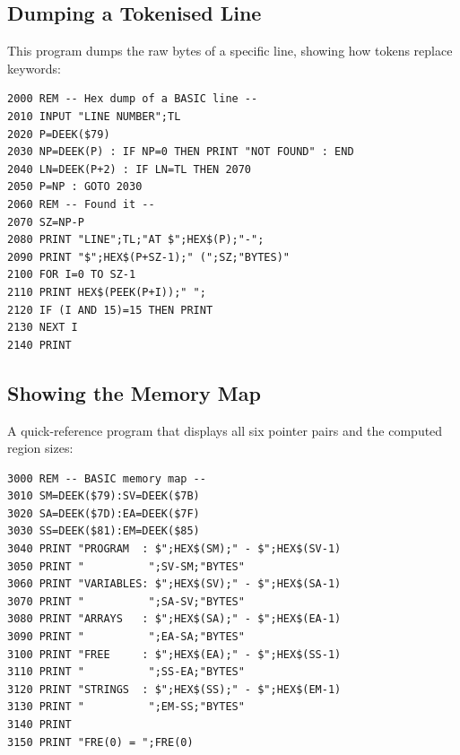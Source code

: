 \subsection{Dumping a Tokenised Line}

This program dumps the raw bytes of a specific line, showing how tokens
replace keywords:

\begin{lstlisting}
2000 REM -- Hex dump of a BASIC line --
2010 INPUT "LINE NUMBER";TL
2020 P=DEEK($79)
2030 NP=DEEK(P) : IF NP=0 THEN PRINT "NOT FOUND" : END
2040 LN=DEEK(P+2) : IF LN=TL THEN 2070
2050 P=NP : GOTO 2030
2060 REM -- Found it --
2070 SZ=NP-P
2080 PRINT "LINE";TL;"AT $";HEX$(P);"-";
2090 PRINT "$";HEX$(P+SZ-1);" (";SZ;"BYTES)"
2100 FOR I=0 TO SZ-1
2110 PRINT HEX$(PEEK(P+I));" ";
2120 IF (I AND 15)=15 THEN PRINT
2130 NEXT I
2140 PRINT
\end{lstlisting}

\subsection{Showing the Memory Map}

A quick-reference program that displays all six pointer pairs and the
computed region sizes:

\begin{lstlisting}
3000 REM -- BASIC memory map --
3010 SM=DEEK($79):SV=DEEK($7B)
3020 SA=DEEK($7D):EA=DEEK($7F)
3030 SS=DEEK($81):EM=DEEK($85)
3040 PRINT "PROGRAM  : $";HEX$(SM);" - $";HEX$(SV-1)
3050 PRINT "          ";SV-SM;"BYTES"
3060 PRINT "VARIABLES: $";HEX$(SV);" - $";HEX$(SA-1)
3070 PRINT "          ";SA-SV;"BYTES"
3080 PRINT "ARRAYS   : $";HEX$(SA);" - $";HEX$(EA-1)
3090 PRINT "          ";EA-SA;"BYTES"
3100 PRINT "FREE     : $";HEX$(EA);" - $";HEX$(SS-1)
3110 PRINT "          ";SS-EA;"BYTES"
3120 PRINT "STRINGS  : $";HEX$(SS);" - $";HEX$(EM-1)
3130 PRINT "          ";EM-SS;"BYTES"
3140 PRINT
3150 PRINT "FRE(0) = ";FRE(0)
\end{lstlisting}
